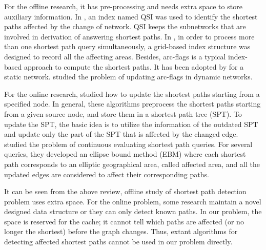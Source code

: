 For the offline research, it has pre-processing and needs extra space to store auxiliary information.
In \cite{tian2009monitoring}, an index named QSI was used to identify the shortest paths affected by the change of network.
QSI keeps the subnetworks that are involved in derivation of answering shortest paths.
In \cite{lee2007}, in order to process more than one shortest path query simultaneously, a grid-based index structure was designed to record all the affecting areas.
Besides, arc-flags is a typical index-based approach to compute the shortest paths. It has been adopted by \cite{lauther2004extremely} for a static network. \cite{berrettini2009arc,d2014fully} studied the problem of updating arc-flags in dynamic networks.

For the online research, \cite{bauer2009batch,d2013dynamically,frigioni1996fully,narvaez2000new,mcquillan1980new} studied how to update the shortest paths starting from a specified node.
In general, these algorithms preprocess the shortest paths starting from a given source node, and store them in a shortest path tree (SPT). To update the SPT, the basic idea is to utilize the information of the outdated SPT and update only the part of the SPT that is affected by the changed edge.
\cite{lee2007} studied the problem of continuous evaluating shortest path queries. For several queries, they developed an ellipse bound method (EBM) where each shortest path corresponds to an elliptic geographical area, called affected area, and all the updated edges are considered to affect their corresponding paths.

It can be seen from the above review, offline study of shortest path detection problem uses extra space. For the online problem, some research maintain a novel designed data structure or they can only detect known paths. In our problem, the space is reserved for the cache; it cannot tell which paths are affected (or no longer the shortest) before the graph changes. Thus, extant algorithms for detecting affected shortest paths cannot be used in our problem directly.


